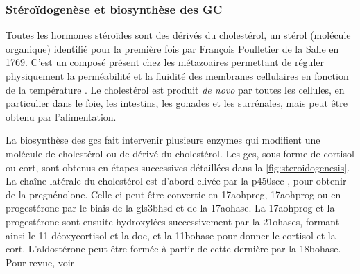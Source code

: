 \documentclass[../main.tex]{subfiles}
\begin{document}
\subsubsection{Stéroïdogenèse et biosynthèse des GC}
Toutes les hormones stéroïdes sont des dérivés du cholestérol, un stérol (molécule organique) identifié pour la première fois par François Poulletier de la Salle en 1769.
C'est un composé présent chez les métazoaires permettant de réguler physiquement la perméabilité et la fluidité des membranes cellulaires en fonction de la température \citep{Cooper1978}.
Le cholestérol est produit \textit{de novo} par toutes les cellules, en particulier dans le foie, les intestins, les gonades et les surrénales, mais peut être obtenu par l'alimentation.
\par
%
%

La biosynthèse des \glspl{gc} fait intervenir plusieurs enzymes qui modifient une molécule de cholestérol ou de dérivé du cholestérol.
Les \glspl{gc}, sous forme de cortisol ou \gls{cort}, sont obtenus en étapes successives détaillées dans la \autoref{fig:steroidogenesis}.
La chaîne latérale du cholestérol est d'abord clivée par la \gls{p450scc} \citep{Chung1986}, pour obtenir de la pregnénolone.
Celle-ci peut être convertie en \gls{17aohpreg}, \gls{17aohprog} ou en progestérone par le biais de la gls{3bhsd} et de la \gls{17aohase}.
La \gls{17aohprog} et la progestérone sont ensuite hydroxylées successivement par la \glspl{21ohase}, formant ainsi le 11-déoxycortisol et la \gls{doc}, et la \gls{11bohase} pour donner le cortisol et la \gls{cort}.
L'aldostérone peut être formée à partir de cette dernière par la \gls{18bohase}.
Pour revue, voir \citep{Ghayee2007}


\end{document}
